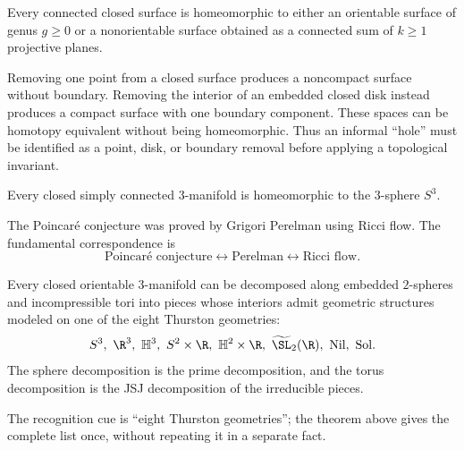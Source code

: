     \begin{theorem}
        Every connected closed surface is homeomorphic to either an orientable
        surface of genus $g\geq 0$ or a nonorientable surface obtained as a
        connected sum of $k\geq 1$ projective planes.
    \end{theorem}

    \begin{remark}
        Removing one point from a closed surface produces a noncompact surface
        without boundary. Removing the interior of an embedded closed disk
        instead produces a compact surface with one boundary component. These
        spaces can be homotopy equivalent without being homeomorphic. Thus an
        informal ``hole'' must be identified as a point, disk, or boundary
        removal before applying a topological invariant.
    \end{remark}

    \begin{theorem}
        Every closed simply connected $3$-manifold is homeomorphic to the
        $3$-sphere $S^3$.
    \end{theorem}

    \begin{remark}
        The Poincaré conjecture was proved by Grigori Perelman using Ricci flow.
        The fundamental correspondence is
        \[
            \text{Poincaré conjecture} \longleftrightarrow
            \text{Perelman} \longleftrightarrow
            \text{Ricci flow}.
        \]
    \end{remark}

    \begin{theorem}
        Every closed orientable $3$-manifold can be decomposed along embedded
        $2$-spheres and incompressible tori into pieces whose interiors admit
        geometric structures modeled on one of the eight Thurston geometries:
        \[
            S^3,\ \R^3,\ \mathbb{H}^3,\ S^2\times\R,\ \mathbb{H}^2\times\R,
            \ \widetilde{\SL}_2(\R),\ \mathrm{Nil},\ \mathrm{Sol}.
        \]
        The sphere decomposition is the prime decomposition, and the torus
        decomposition is the JSJ decomposition of the irreducible pieces.
    \end{theorem}

    \begin{remark}
        The recognition cue is ``eight Thurston geometries''; the theorem above
        gives the complete list once, without repeating it in a separate fact.
    \end{remark}

